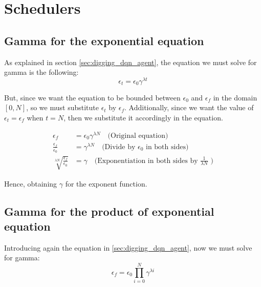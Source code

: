 \chapter{Schedulers}
\label{app:gamma_proof}

\section{Gamma for the exponential equation}
As explained in section \ref{sec:digging_dqn_agent}, the equation we must solve for gamma is the following: 
\begin{equation}
	\epsilon_t = \epsilon_0 \gamma^{\lambda t}
\end{equation}

But, since we want the equation to be bounded between $\epsilon_0$ and $\epsilon_f$ in the domain $[0, N]$, so we must substitute $\epsilon_t$ by $\epsilon_f$. Additionally, since we want the value of $\epsilon_t = \epsilon_f$ when $t = N$, then we substitute it accordingly in the equation.

\begin{align}
	\epsilon_f &=  \epsilon_0 \gamma^{\lambda N} \quad \text{(Original equation)} \label{eq1} \\
	\frac{\epsilon_f}{\epsilon_0} &= \gamma^{\lambda N} \quad \text{(Divide by $\epsilon_0$ in both sides)} \label{eq2} \\
	\sqrt[\lambda N]{\frac{\epsilon_f}{\epsilon_0}} &= \gamma \quad \text{(Exponentiation in both sides by $\frac{1}{\lambda N}$ )} \label{eq3} 
\end{align}

Hence, obtaining $\gamma$ for the exponent function.

\section{Gamma for the product of exponential equation}
Introducing again the equation in \ref{sec:digging_dqn_agent}, now we must solve for gamma: 
\begin{equation}
	\epsilon_f = \epsilon_0 \prod_{i=0}^{N} \gamma^{\lambda i}
\end{equation}

